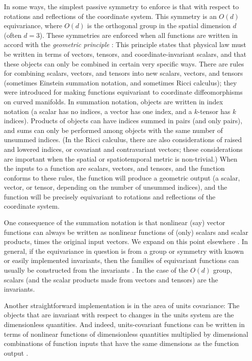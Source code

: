 \documentclass{article}
\theoremstyle{plain}
\theoremstyle{definition}
\theoremstyle{remark}
\begin{document}
In some ways, the simplest passive symmetry to enforce is that with respect to rotations and reflections of the coordinate system.
This symmetry is an $O(d)$ equivariance, where $O(d)$ is the orthogonal group in the spatial dimension $d$ (often $d=3$).
These symmetries are enforced when all functions are written in accord with the \emph{geometric principle} \cite{mcp}:
This principle states that physical law must be written in terms of vectors, tensors, and coordinate-invariant scalars, and that these objects can only be combined in certain very specific ways.
There are rules for combining scalars, vectors, and tensors into new scalars, vectors, and tensors (sometimes Einstein \cite{einstein} summation notation, and sometimes Ricci \cite{ricci} calculus); they were introduced for making functions equivariant to coordinate diffeomorphisms on curved manifolds.
In summation notation, objects are written in index notation (a scalar has no indices, a vector has one index, and a $k$-tensor has $k$ indices).
Products of objects can have indices summed in pairs (and only pairs), and sums can only be performed among objects with the same number of unsummed indices.
(In the Ricci calculus, there are also considerations of raised and lowered indices, or covariant and contravariant vectors; these considerations are important when the spatial or spatiotemporal metric is non-trivial.)
When the inputs to a function are scalars, vectors, and tensors, and the function conforms to these rules, the function will produce a geometric output (a scalar, vector, or tensor, depending on the number of unsummed indices), and the function will be precisely equivariant to rotations and reflections of the coordinate system.

One consequence of the summation notation is that nonlinear (say) vector functions can always be written as nonlinear functions of (only) scalars and scalar products, times the original input vectors.
We expand on this point elsewhere \cite{villar2021scalars}.
In general, if the equivariance in question is from a group or symmetry with known or easily implemented invariants, then the families of equivariant functions can usually be constructed from the invariants \cite{blum2022equivariant}.
In the case of the $O(d)$ group, scalars (and the scalar products made from vectors and tensors) are the invariants.

Another straightforward implementation is in the area of units covariance:
The objects that are invariant with respect to changes in the units system are the dimensionless quantities.
And indeed, units-covariant functions can be written in terms of nonlinear functions of dimensionless quantities multiplied by dimensional combinations of function inputs that have the same dimensions as the function output \cite{villar2022dimensionless}.
\end{document}
